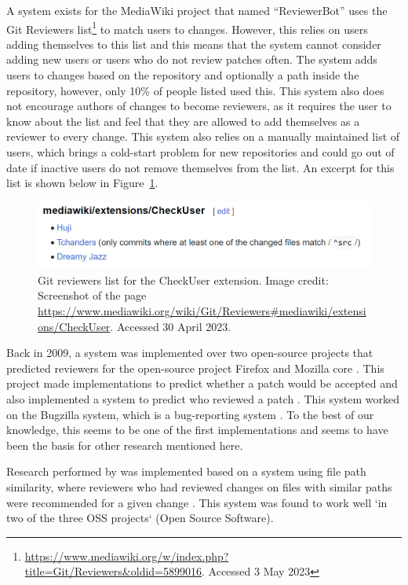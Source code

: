 A system exists for the MediaWiki project that named ``ReviewerBot'' uses the Git Reviewers list\footnote{\url{https://www.mediawiki.org/w/index.php?title=Git/Reviewers\&oldid=5899016}. Accessed 3 May 2023} to match users to changes. However, this relies on users adding themselves to this list and this means that the system cannot consider adding new users or users who do not review patches often. The system adds users to changes based on the repository and optionally a path inside the repository, however, only 10\% of people listed used this. This system also does not encourage authors of changes to become reviewers, as it requires the user to know about the list and feel that they are allowed to add themselves as a reviewer to every change. This system also relies on a manually maintained list of users, which brings a cold-start problem for new repositories and could go out of date if inactive users do not remove themselves from the list. An excerpt for this list is shown below in Figure~\ref{fig:checkuser-extension-reviewer-list}.

\begin{figure}[h]
    \centering
    \includegraphics[scale=0.9]{images/git-reviewers-list-checkuser.png}
    \caption[Git reviewers list for the CheckUser extension.]{Git reviewers list for the CheckUser extension. Image credit: Screenshot of the page \url{https://www.mediawiki.org/wiki/Git/Reviewers\#mediawiki/extensions/CheckUser}. Accessed 30 April 2023.}
    \label{fig:checkuser-extension-reviewer-list}
\end{figure}

Back in 2009, a system was implemented over two open-source projects that predicted reviewers for the open-source project Firefox and Mozilla core \citep[p. 1]{jeong2009improving}. This project made implementations to predict whether a patch would be accepted and also implemented a system to predict who reviewed a patch \citep[p. 2]{jeong2009improving}. This system worked on the Bugzilla system, which is a bug-reporting system \citep{bugzilla:about}. To the best of our knowledge, this seems to be one of the first implementations and seems to have been the basis for other research mentioned here.

Research performed by \cite{10.1145/2593702.2593705} was implemented based on a system using file path similarity, where reviewers who had reviewed changes on files with similar paths were recommended for a given change \citep[p. 120]{10.1145/2593702.2593705}. This system was found to work well `in two of the three OSS projects` (Open Source Software).

